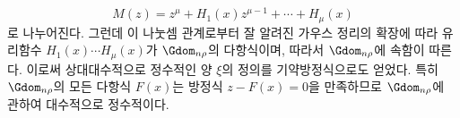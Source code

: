 
\[
M(z)=z^\mu+H_1(x)z^{\mu-1}+\cdots+H_\mu(x)
\]
로 나누어진다. 그런데 이 나눗셈 관계로부터 잘 알려진 가우스 정리의 확장에 따라 유리함수 $H_1(x)\cdots H_\mu(x)$가 $\Gdom_{n\rho}$의 다항식이며, 따라서 $\Gdom_{n\rho}$에 속함이 따른다. 이로써 상대대수적으로 정수적인 양 $\xi$의 정의를 기약방정식으로도 얻었다. 특히 $\Gdom_{n\rho}$의 모든 다항식 $F(x)$는 방정식 $z-F(x)=0$을 만족하므로 $\Gdom_{n\rho}$에 관하여 대수적으로 정수적이다.
